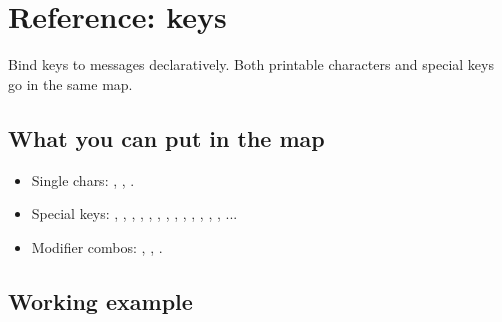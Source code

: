 \chapter{Reference:  keys}
\label{ch:refman-keymap}

\begin{aside}
Bind keys to messages declaratively. Both printable
characters and special keys go in the same map.
\end{aside}

\section{What you can put in the map}

\begin{itemize}[leftmargin=*]
  \item Single chars: , , .
  \item Special keys: ,
    , , ,
    , , ,
    , , ,
    , , ,
    ...
  \item Modifier combos: ,
    , .
\end{itemize}

\section{Working example}

